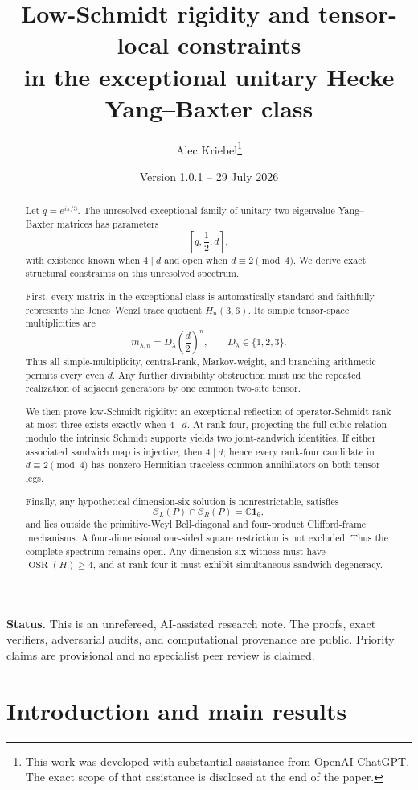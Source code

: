 \documentclass[11pt]{article}
\title{\vspace{-1.4cm}\textbf{Low-Schmidt rigidity and tensor-local constraints}\\[0.2em]
\textbf{in the exceptional unitary Hecke Yang--Baxter class}}
\author{Alec Kriebel\thanks{This work was developed with substantial
assistance from OpenAI ChatGPT. The exact scope of that assistance is
disclosed at the end of the paper.}}
\date{Version 1.0.1 -- 29 July 2026}
\theoremstyle{definition}
\theoremstyle{remark}
\newcommand{\Id}{\mathbf 1}
\newcommand{\OSR}{\operatorname{OSR}}
\newcommand{\bbC}{\mathbb C}
\newcommand{\cC}{\mathcal C}
\begin{document}
\maketitle

\begin{abstract}
Let \(q=e^{i\pi/3}\). The unresolved exceptional family of unitary
two-eigenvalue Yang--Baxter matrices has parameters
\[
  \left[q,\frac12,d\right],
\]
with existence known when \(4\mid d\) and open when
\(d\equiv2\pmod4\). We derive exact structural constraints on this
unresolved spectrum.

First, every matrix in the exceptional class is automatically standard
and faithfully represents the Jones--Wenzl trace quotient \(H_n(3,6)\).
Its simple tensor-space multiplicities are
\[
  m_{\lambda,n}=D_\lambda\left(\frac d2\right)^n,
  \qquad D_\lambda\in\{1,2,3\}.
\]
Thus all simple-multiplicity, central-rank, Markov-weight, and branching
arithmetic permits every even \(d\). Any further divisibility obstruction
must use the repeated realization of adjacent generators by one common
two-site tensor.

We then prove low-Schmidt rigidity: an exceptional reflection of
operator-Schmidt rank at most three exists exactly when \(4\mid d\).
At rank four, projecting the full cubic relation modulo the intrinsic
Schmidt supports yields two joint-sandwich identities. If either associated
sandwich map is injective, then \(4\mid d\); hence every rank-four
candidate in \(d\equiv2\pmod4\) has nonzero Hermitian traceless common
annihilators on both tensor legs.

Finally, any hypothetical dimension-six solution is nonrestrictable,
satisfies
\[
  \cC_L(P)\cap\cC_R(P)=\bbC\Id_6,
\]
and lies outside the primitive-Weyl Bell-diagonal and four-product
Clifford-frame mechanisms. A four-dimensional one-sided square restriction
is not excluded. Thus the complete spectrum remains open. Any
dimension-six witness must have \(\OSR(H)\ge4\), and at rank four it must
exhibit simultaneous sandwich degeneracy.
\end{abstract}

\medskip
\noindent\textbf{Status.}
This is an unrefereed, AI-assisted research note. The proofs, exact
verifiers, adversarial audits, and computational provenance are public.
Priority claims are provisional and no specialist peer review is claimed.

\section{Introduction and main results}\label{sec:intro}
\end{document}
